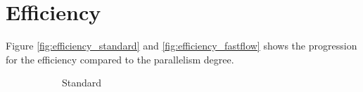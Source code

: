    \section{Efficiency} %
    \label{sec:efficiency}
        Figure \ref{fig:efficiency_standard} and \ref{fig:efficiency_fastflow} shows the progression for the
        efficiency compared to the parallelism degree.
    \begin{figure}
        \centering
        \begin{subfigure}{0.33\textwidth}
            \caption{Standard}
            \label{fig:completion_time_standard}
        \end{subfigure}
        \begin{subfigure}{0.33\textwidth}
\end{subfigure}
\end{figure}
